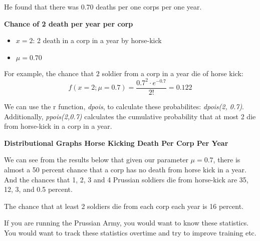\documentclass[
]{book}
\providecommand{\tightlist}{%
  \setlength{\itemsep}{0pt}\setlength{\parskip}{0pt}}
\begin{document}
He found that there was 0.70 deaths per one corps per one year.

\textbf{Chance of 2 death per year per corp}

\begin{itemize}
\tightlist
\item
  \(x=2\): 2 death in a corp in a year by horse-kick
\item
  \(\mu=0.70\)
\end{itemize}

For example, the chance that \(2\) soldier from a corp in a year die of horse kick:
\[f\left(x=2;\mu=0.7\right) = \frac{0.7^{2} \cdot e^{-0.7}}{2!} = 0.122\]

We can use the r function, \emph{dpois}, to calculate these probabilites: \emph{dpois(2, 0.7)}. Additionally, \emph{ppois(2,0.7)} calculates the cumulative probability that at most 2 die from horse-kick in a corp in a year.

\textbf{Distributional Graphs Horse Kicking Death Per Corp Per Year}

We can see from the results below that given our parameter \(\mu=0.7\), there is almost a 50 percent chance that a corp has no death from horse kick in a year. And the chances that 1, 2, 3 and 4 Prussian soldiers die from horse-kick are 35, 12, 3, and 0.5 percent.

The chance that at least 2 soldiers die from each corp each year is 16 percent.

If you are running the Prussian Army, you would want to know these statistics. You would want to track these statistics overtime and try to improve training etc.
\end{document}
